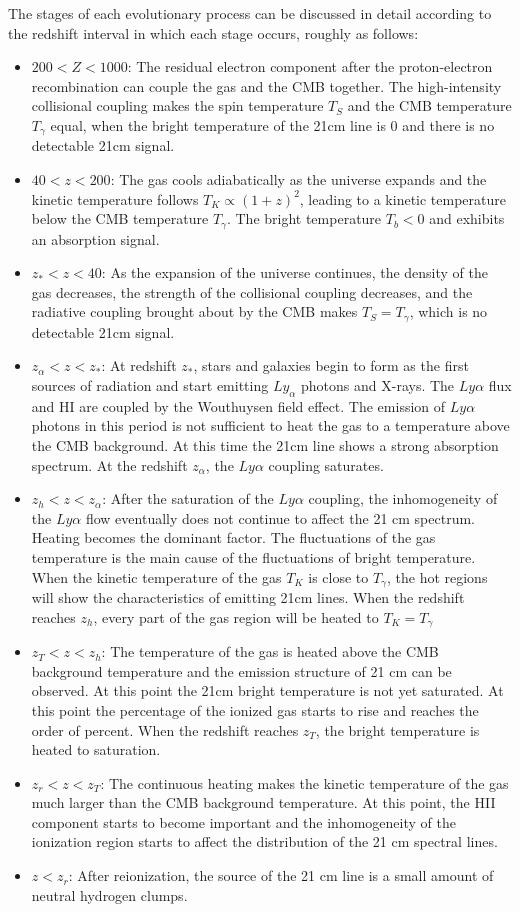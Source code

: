 \documentclass{article}
\begin{document}
The stages of each evolutionary process can be discussed in detail according to the redshift interval in which each stage occurs, roughly as follows:
\begin{itemize}
    \item $200<Z<1000$: The residual electron component after the proton-electron recombination can couple the gas and the CMB together. The high-intensity collisional coupling makes the spin temperature $T_{S}$ and the CMB temperature $T_{\gamma}$ equal, when the bright temperature of the 21cm line is 0 and there is no detectable 21cm signal.
    \item $40<z<200$: The gas cools adiabatically as the universe expands and the kinetic temperature follows $T_K\propto (1+z)^2$, leading to a kinetic temperature below the CMB temperature $T_{\gamma}$. The bright temperature $T_b < 0$ and exhibits an absorption signal. 
    \item $z_*<z<40$: As the expansion of the universe continues, the density of the gas decreases, the strength of the collisional coupling decreases, and the radiative coupling brought about by the CMB makes $T_S=T_{\gamma}$, which is no detectable 21cm signal.
    \item $z_\alpha < z < z_*$: At redshift $z_*$, stars and galaxies begin to form as the first sources of radiation and start emitting $Ly_\alpha$ photons and X-rays. The $Ly\alpha$ flux and HI are coupled by the Wouthuysen field effect. The emission of $Ly\alpha$ photons in this period is not sufficient to heat the gas to a temperature above the CMB background. At this time the 21cm line shows a strong absorption spectrum. At the redshift $z_\alpha$, the $Ly\alpha$ coupling saturates.
    \item $z_h < z < z_\alpha$: After the saturation of the $Ly\alpha$ coupling, the inhomogeneity of the $Ly\alpha$ flow eventually does not continue to affect the 21 cm spectrum. Heating becomes the dominant factor. The fluctuations of the gas temperature is the main cause of the fluctuations of bright temperature. When the kinetic temperature of the gas $T_K$ is close to $T_\gamma$, the hot regions will show the characteristics of emitting 21cm lines. When the redshift reaches $z_h$, every part of the gas region will be heated to $T_K=T_\gamma$
    \item $z_T<z<z_h$: The temperature of the gas is heated above the CMB background temperature and the emission structure of 21 cm can be observed. At this point the 21cm bright temperature is not yet saturated. At this point the percentage of the ionized gas starts to rise and reaches the order of percent. When the redshift reaches $z_T$, the bright temperature is heated to saturation.
    \item $z_r<z<z_T$: The continuous heating makes the kinetic temperature of the gas much larger than the CMB background temperature. At this point, the HII component starts to become important and the inhomogeneity of the ionization region starts to affect the distribution of the 21 cm spectral lines.
    \item $z<z_r$: After reionization, the source of the 21 cm line is a small amount of neutral hydrogen clumps.
\end{itemize}
\end{document}

